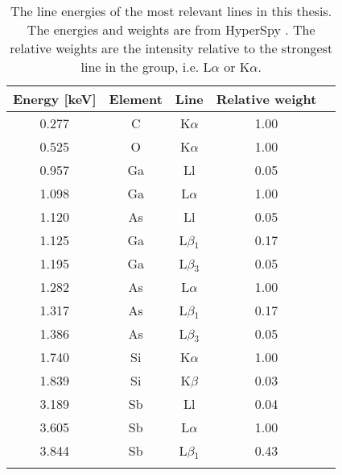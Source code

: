\begin{table}[p]
    \centering
    \caption{
        The line energies of the most relevant lines in this thesis.
        The energies and weights are from HyperSpy \cite{hyperspy_1.7.1}.
        The relative weights are the intensity relative to the strongest line in the group, i.e. L$\alpha$ or K$\alpha$.
    }
    \label{tab:theory:lineEnergies}
    \begin{tabular}{ccccc}
        Energy [keV] & Element & Line          & Relative weight \\
        \hline
        0.277        & C       & K$\alpha$     & 1.00            \\
        0.525        & O       & K$\alpha$     & 1.00            \\
        0.957        & Ga      & Ll            & 0.05            \\
        1.098        & Ga      & L$\alpha$     & 1.00            \\
        1.120        & As      & Ll            & 0.05            \\
        1.125        & Ga      & L$\beta$$_1$  & 0.17            \\
        1.195        & Ga      & L$\beta$$_3$  & 0.05            \\
        1.282        & As      & L$\alpha$     & 1.00            \\
        1.317        & As      & L$\beta$$_1$  & 0.17            \\
        1.386        & As      & L$\beta$$_3$  & 0.05            \\
        1.740        & Si      & K$\alpha$     & 1.00            \\
        1.839        & Si      & K$\beta$      & 0.03            \\
        3.189        & Sb      & Ll            & 0.04            \\
        3.605        & Sb      & L$\alpha$     & 1.00            \\
        3.844        & Sb      & L$\beta$$_1$  & 0.43            \\
$$
\end{tabular}
\end{table}
